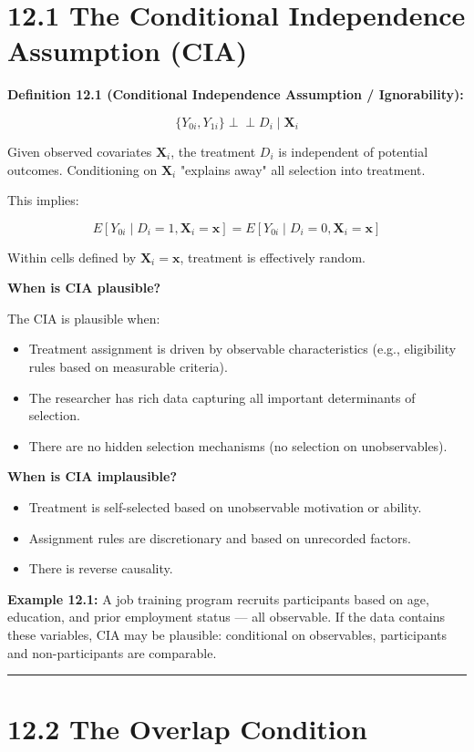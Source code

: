\section{12.1 The Conditional Independence Assumption (CIA)}

\textbf{Definition 12.1 (Conditional Independence Assumption / Ignorability):}

\[
\{Y_{0i}, Y_{1i}\} \perp\!\!\!\perp D_i \mid \mathbf{X}_i
\]

Given observed covariates $\mathbf{X}_i$, the treatment $D_i$ is independent of potential outcomes. Conditioning on $\mathbf{X}_i$ "explains away" all selection into treatment.

This implies:

\[
E[Y_{0i} \mid D_i = 1, \mathbf{X}_i = \mathbf{x}] = E[Y_{0i} \mid D_i = 0, \mathbf{X}_i = \mathbf{x}]
\]

Within cells defined by $\mathbf{X}_i = \mathbf{x}$, treatment is effectively random.

\textbf{When is CIA plausible?}

The CIA is plausible when:
\begin{itemize}
\item Treatment assignment is driven by observable characteristics (e.g., eligibility rules based on measurable criteria).
\item The researcher has rich data capturing all important determinants of selection.
\item There are no hidden selection mechanisms (no selection on unobservables).
\end{itemize}

\textbf{When is CIA implausible?}
\begin{itemize}
\item Treatment is self-selected based on unobservable motivation or ability.
\item Assignment rules are discretionary and based on unrecorded factors.
\item There is reverse causality.
\end{itemize}

\textbf{Example 12.1:} A job training program recruits participants based on age, education, and prior employment status --- all observable. If the data contains these variables, CIA may be plausible: conditional on observables, participants and non-participants are comparable.

\medskip\hrule\medskip

\section{12.2 The Overlap Condition}

